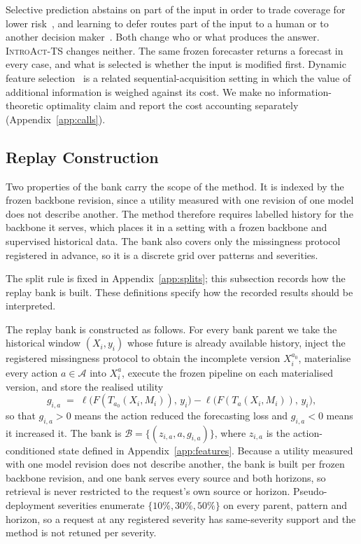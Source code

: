 \documentclass{article}
\newcommand{\introact}{\textsc{IntroAct-TS}}
\newcommand{\calA}{\mathcal{A}}
\newcommand{\calB}{\mathcal{B}}
\newcommand{\loss}{\ell}
\begin{document}
Selective prediction abstains on part of the input in order to trade coverage for lower
risk~\citep{chow1970optimum,vovk2005algorithmic,geifman2017selective,lei2018distribution}, and
learning to defer routes part of the input to a human or to another decision
maker~\citep{madras2018predict,mozannar2020consistent}. Both change who or what produces the
answer. \introact{} changes neither. The same frozen forecaster returns a forecast in every
case, and what is selected is whether the input is modified first. Dynamic feature
selection~\citep{he2024dime} is a related sequential-acquisition setting in which the value of
additional information is weighed against its cost. We make no information-theoretic
optimality claim and report the cost accounting separately (Appendix~\ref{app:calls}).

\subsection{Replay Construction}
\label{app:replay}
Two properties of the bank carry the scope of the method. It is indexed by the frozen backbone
revision, since a utility measured with one revision of one model does not describe another.
The method therefore requires labelled history for the backbone it serves, which places it in
a setting with a frozen backbone and supervised historical data. The bank also
covers only the missingness protocol registered in advance, so it is a discrete grid over
patterns and severities.

The split rule is fixed in Appendix~\ref{app:splits}; this subsection records how the replay bank is built. These definitions specify how the recorded results should be interpreted.

The replay bank is constructed as follows. For every bank parent we take the historical
window $(X_i, y_i)$ whose future is already available history, inject the registered
missingness protocol to obtain the incomplete version $X_i^{a_0}$, materialise every action
$a \in \calA$ into $X_i^{a}$, execute the frozen pipeline on each materialised version, and
store the realised utility
\begin{equation}
  g_{i,a} \;=\; \loss\big(F(T_{a_0}(X_i, M_i)),\, y_i\big) - \loss\big(F(T_{a}(X_i, M_i)),\, y_i\big),
  \label{eq:app-gain}
\end{equation}
so that $g_{i,a} > 0$ means the action reduced the forecasting loss and $g_{i,a} < 0$ means it
increased it. The bank is
$\calB = \{(z_{i,a}, a, g_{i,a})\}$, where $z_{i,a}$ is the action-conditioned state defined
in Appendix~\ref{app:features}. Because a utility measured with one model revision does not describe another, the bank is
built per frozen backbone revision, and one bank serves every source and both horizons, so
retrieval is never restricted to the request's own source or horizon. Pseudo-deployment
severities enumerate
$\{10\%, 30\%, 50\%\}$ on every parent, pattern and horizon, so a request at any registered
severity has same-severity support and the method is not retuned per severity.
\end{document}
